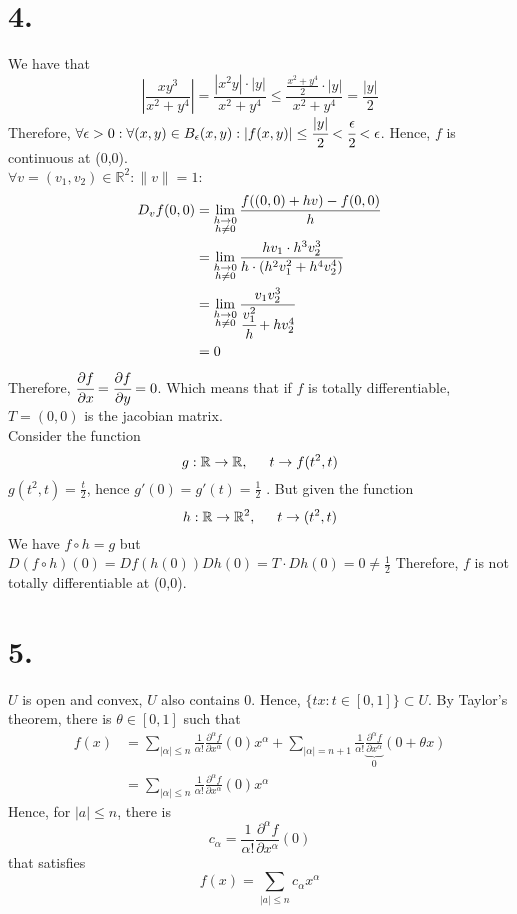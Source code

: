 \documentclass[11pt]{article}
\begin{document}
\section*{4.}
We have that 
\[
\left| \frac{xy^3}{x^2 + y^4} \right| = \frac{|x^2y| \cdot |y|}{x^2 + y^4} \le \frac{\frac{x^2 + y^4}{2} \cdot |y|}{x^2 + y^4} = \frac{|y|}{2}
\]
Therefore, $\forall \epsilon > 0: \forall (x,y) \in B_\epsilon(x,y): |f(x,y)| \le \cfrac{|y|}{2} < \cfrac{\epsilon}{2} < \epsilon$. Hence, $f$ is continuous at (0,0). \\
$\forall v= (v_1,v_2) \in \mathbb{R}^2: \|v\| = 1:$
\begin{equation*}
\begin{aligned}
D_vf(0,0) &= \lim_{\substack{h \to 0 \\ h \ne 0}} \frac{f( (0,0) + hv) - f(0,0)}{h} \\
&= \lim_{\substack{h \to 0 \\ h \ne 0}}\frac{hv_1 \cdot h^3v_2^3}{h \cdot (h^2v_1^2 + h^4v_2^4)} \\
&= \lim_{\substack{h \to 0 \\ h \ne 0}} \frac{v_1v_2^3}{\cfrac{v_1^2}{h}  + h v_2^4} \\
&= 0
\end{aligned}
\end{equation*}
Therefore, $\cfrac{\partial f}{\partial x} = \cfrac{\partial f}{\partial y} = 0$. Which means that if $f$ is totally differentiable, $T = (0,0)$ is the jacobian matrix. \\
Consider the function 
\[
g: \mathbb{R} \to \mathbb{R}, \indent t \to f(t^2,t)
\]
$g(t^2,t) = \frac{t}{2}$, hence $g'(0) = g'(t) = \frac{1}{2}$ . But given the function
\[
h: \mathbb{R} \to \mathbb{R}^2, \indent t \to (t^2,t)
\]
We have $f \circ h = g$ but $D(f \circ h)(0) = Df(h(0))Dh(0) = T \cdot Dh(0) = 0 \ne \frac{1}{2}$
Therefore, $f$ is not totally differentiable at (0,0).
\pagebreak
\section*{5.}
$U$ is open and convex, $U$ also contains 0. Hence, $\{tx: t \in [0,1]\} \subset U$. By Taylor's theorem, there is $\theta \in [0,1]$ such that 
\begin{equation*}
\begin{aligned}
f(x) &= \sum_{|\alpha| \le n} \frac{1}{\alpha !} \frac{\partial ^\alpha f }{\partial x^\alpha}(0)x^\alpha + \sum_{|\alpha| = n+1} \frac{1}{\alpha !} \underbrace{\frac{\partial^\alpha f}{\partial x^\alpha}}_{0}(0 + \theta x) \\
&= \sum_{|\alpha| \le n} \frac{1}{\alpha !} \frac{\partial ^\alpha f }{\partial x^\alpha}(0)x^\alpha 
\end{aligned}
\end{equation*}
Hence, for $|a| \le  n$, there is
\[
c_\alpha = \frac{1}{\alpha !} \frac{\partial^\alpha f}{\partial x^\alpha} (0)
\]
that satisfies
\[
f(x) = \sum_{|a| \le n} c_\alpha x^\alpha
\]
\pagebreak
\end{document}
